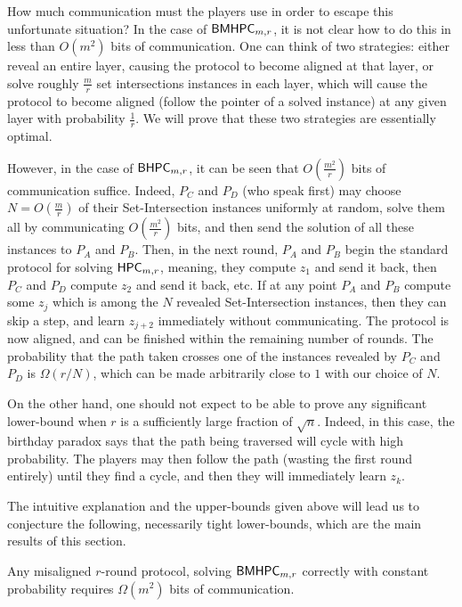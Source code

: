 \documentclass[11pt,letterpaper]{article}
\theoremstyle{definition}
\newcommand{\bhpc}{\ensuremath{\textnormal{\textsf{BHPC}}}\xspace}
\newcommand{\bmhpc}{\ensuremath{\textnormal{\textsf{BMHPC}}}\xspace}
\newcommand{\hpc}{\ensuremath{\textnormal{\textsf{HPC}}}\xspace}
\begin{document}
\medskip\noindent
How much communication must the players use in order to escape this unfortunate situation? In the case of $\bmhpc_{m,r}$, it is not clear how to do this in less than $O(m^2)$ bits of communication. One can think of two strategies: either reveal an entire layer, causing the protocol to become aligned at that layer, or solve roughly $\frac{m}{r}$ set intersections instances in each layer, which will cause the protocol to become aligned (follow the pointer of a solved instance) at any given layer with probability $\frac{1}{r}$. We will prove that these two strategies are essentially optimal.

However, in the case of $\bhpc_{m,r}$, it can be seen that $O(\frac{m^2}{r})$ bits of communication suffice. Indeed, $P_C$ and $P_D$ (who speak first) may choose $N = O(\frac{m}{r})$ of their Set-Intersection instances uniformly at random, solve them all by communicating $O(\frac{m^2}{r})$ bits, and then send the solution of all these instances to $P_A$ and $P_B$. Then, in the next round, $P_A$ and $P_B$ begin the standard protocol for solving $\hpc_{m,r}$, meaning, they compute $z_1$ and send it back, then $P_C$ and $P_D$ compute $z_2$ and send it back, etc. If at any point $P_A$ and $P_B$ compute some $z_j$ which is among the $N$ revealed Set-Intersection instances, then they can skip a step, and learn $z_{j+2}$ immediately without communicating. The protocol is now aligned, and can be finished within the remaining number of rounds. The probability that the path taken crosses one of the instances revealed by $P_C$ and $P_D$ is $\Omega(r/ N)$, which can be made arbitrarily close to $1$ with our choice of $N$.

On the other hand, one should not expect to be able to prove any significant lower-bound when $r$ is a sufficiently large fraction of $\sqrt n$. Indeed, in this case, the birthday paradox says that the path being traversed will cycle with high probability. The players may then follow the path (wasting the first round entirely) until they find a cycle, and then they will immediately learn $z_k$.

\medskip\noindent
The intuitive explanation and the upper-bounds given above will lead us to conjecture the following, necessarily tight lower-bounds, which are the main results of this section.

 \begin{theorem} \label{thm:lb-mhpc}
 Any misaligned $r$-round protocol, solving $\bmhpc_{m,r}$ correctly with constant probability requires $\Omega(m^2)$ bits of communication.
 \end{theorem}
 
\end{document}
